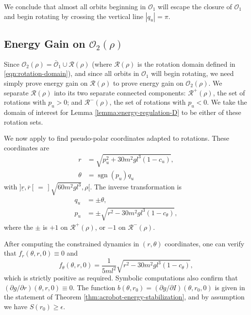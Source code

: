 \documentclass[journal,twoside,web, twocolumn,draftcls]{ieeecolor}
\DeclareMathOperator{\Sign}{sgn}
\newcommand*{\sign}[1]{\Sign\left(#1\right)}
\begin{document}
We conclude that almost all orbits beginning in \(\mathcal{O}_1\) will
escape the closure of \(\mathcal{O}_1\) and begin rotating by crossing the
vertical line \(|q_u| = \pi\).

\subsection{Energy Gain on \(\mathcal{O}_2(\rho)\)}
Since \(\mathcal{O}_2(\rho) = \bar{\mathcal{O}}_1 \cup \mathcal{R}(\rho)\)
(where \(\mathcal{R}(\rho)\) is the rotation domain defined in
\eqref{eqn:rotation-domain}), and since all orbits in \(\mathcal{O}_1\) will
begin rotating, we need simply prove energy gain on
\(\mathcal{R}(\rho)\) to prove energy gain on \(\mathcal{O}_2(\rho)\).
We separate \(\mathcal{R}(\rho)\) into its two separate connected components:
\(\mathcal{R}^+(\rho)\), the set of rotations with \(p_u > 0\); 
and \(\mathcal{R}^-(\rho)\), the set of rotations with \(p_u < 0\).
We take the domain of interest for Lemma \ref{lemma:energy-regulation-D} to be
either of these rotation sets. 

We now apply
\cite[Eqn. (8)]{dynamic_vhcs_stabilize_closed_orbits} to find pseudo-polar coordinates
adapted to rotations.
These coordinates are 
\begin{align}
    \label{eqn:r-rot}
    r &= \sqrt{p_u^2 + 30m^2gl^3(1-c_u)}
    , \\
    \label{eqn:theta-rot}
    \theta &= \sign{p_u} q_u
\end{align}
with \(]\underline{r},\overline{r}[ \, = \, ]\sqrt{60m^2gl^3}, \rho[\).
The inverse transformation is
\begin{align*}
    q_u &= \pm \theta
    , \\
    p_u &= \pm \sqrt{r^2-30m^2gl^3(1-c_\theta)}
    ,
\end{align*}
where the \(\pm\) is \(+1\) on \(\mathcal{R}^+(\rho)\), or \(-1\) on
\(\mathcal{R}^-(\rho)\).

After computing the constrained dynamics in
\((r,\theta)\) coordinates, one can verify that
\(f_r(\theta,r,0) \equiv 0\) and
\[
    f_\theta(\theta,r,0) = \frac{1}{5ml^2} \sqrt{r^2 - 30m^2gl^3(1-c_\theta)}
,
\]
which is strictly positive as required.
Symbolic computations
also confirm that \((\partial g/\partial r)(\theta,r,0) \equiv 0\).
The function \(b(\theta,r_0) = (\partial g/\partial I)(\theta,r_0,0)\) is given
in the statement of Theorem \ref{thm:acrobot-energy-stabilization}, and by
assumption we have \(S(r_0) \geq \epsilon\).
\end{document}
